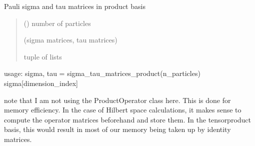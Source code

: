 \documentclass[letterpaper,10pt,english]{sphinxmanual}
\begin{document}

\begin{fulllineitems}
\label{\detokenize{spinbox:spinbox.extras.sigma_tau_matrices_product}}
\pysigstartsignatures
{}
\pysigstopsignatures
\sphinxAtStartPar
Pauli sigma and tau matrices in product basis
\begin{quote}\begin{description}
\sphinxAtStartPar
{} () \textendash{} number of particles

\sphinxAtStartPar
(sigma matrices, tau matrices)

\sphinxAtStartPar
tuple of lists

\end{description}\end{quote}

\sphinxAtStartPar
usage: 
sigma, tau = sigma\_tau\_matrices\_product(n\_particles) 
sigma{[}dimension\_index{]}

\sphinxAtStartPar
note that I am not using the ProductOperator class here. This is done for memory efficiency.
In the case of Hilbert space calculations, it makes sense to compute the operator matrices beforehand and store them.
In the tensor\sphinxhyphen{}product basis, this would result in most of our memory being taken up by identity matrices.

\end{fulllineitems}

\end{document}
